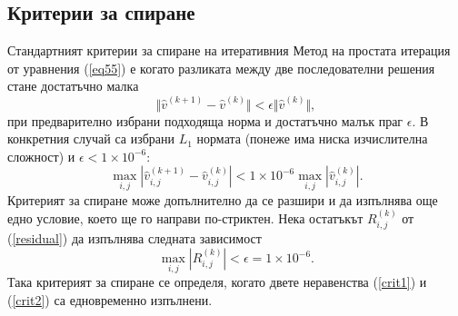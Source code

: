 \documentclass{article}
\newcommand{\rf}[1]{(\ref{#1})}
\begin{document}
\subsection{Критерии за спиране}
Стандартният критерии за спиране на итеративния Метод на простата итерация от уравнения \rf{eq55} е когато разликата между две последователни решения стане достатъчно малка
\begin{equation*}
\Vert \widehat{v}^{(k+1)}-\widehat{v}^{(k)}\Vert  < \epsilon \Vert \widehat{v}^{(k)}\Vert ,
\end{equation*}
при предварително избрани подходяща норма и достатъчно малък праг $\epsilon$. В конкретния случай са избрани $L_1$ нормата (понеже има ниска изчислителна сложност) и $\epsilon < 1\times10^{-6}$:
\begin{equation}\label{crit1}
\max_{i,j} |\widehat{v}^{(k+1)}_{i,j}-\widehat{v}^{(k)}_{i,j}| < 1\times10^{-6} \max_{i,j} |\widehat{v}^{(k)}_{i,j}|.
\end{equation}
Критерият за спиране може допълнително да се разшири и да изпълнява още едно условие, което ще го направи по-стриктен. Нека остатъкът $R_{i,j}^{(k)}$ от \rf{residual} да изпълнява следната зависимост
\begin{equation}\label{crit2}
\max_{i,j} |R_{i,j}^{(k)}| < \epsilon = 1\times10^{-6}.
\end{equation}
Така критерият за спиране се определя, когато двете неравенства \rf{crit1} и \rf{crit2} са едновременно изпълнени.
\end{document}
